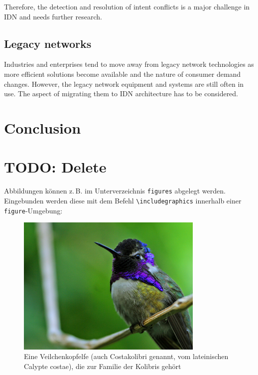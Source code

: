 Therefore, the detection and resolution of intent conflicts is a major challenge in IDN and needs further research.


\subsection{Legacy networks}
Industries and enterprises tend to move away from legacy network technologies as more efficient solutions become available and the nature of consumer demand changes. However, the legacy network equipment and systems are still often in use. The aspect of migrating them to IDN architecture has to be considered.\cite{Saha2018}



\section{Conclusion}
\label{sec:Conclusion}





\section{TODO: Delete}
\label{sec:Delete}
Abbildungen können z.\,B. im Unterverzeichnis \texttt{figures} abgelegt werden.
Eingebunden werden diese mit dem Befehl \texttt{\textbackslash includegraphics} innerhalb
einer \texttt{figure}-Umgebung:
\begin{figure}[htb]
  \centering
  \includegraphics[width=0.8\textwidth]{figures/Hummingbird.jpg}
  \caption{Eine Veilchenkopfelfe (auch Costakolibri genannt, vom lateinischen Calypte costae), die zur Familie der Kolibris gehört }
  \label{fig:kolibri}
\end{figure}

